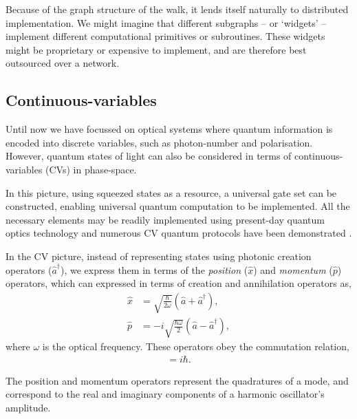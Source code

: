Because of the graph structure of the walk, it lends itself naturally to distributed implementation. We might imagine that different subgraphs -- or `widgets' \cite{bib:Lovett10, bib:Childs09} -- implement different computational primitives or subroutines. These widgets might be proprietary or expensive to implement, and are therefore best outsourced over a network.

%
%

\subsection{Continuous-variables} \label{sec:CV_QC} 

Until now we have focussed on optical systems where quantum information is encoded into discrete variables, such as photon-number and polarisation. However, quantum states of light can also be considered in terms of continuous-variables (CVs) in phase-space.

In this picture, using squeezed states as a resource, a universal gate set can be constructed, enabling universal quantum computation to be implemented. All the necessary elements may be readily implemented using present-day quantum optics technology and numerous CV quantum protocols have been demonstrated \cite{bib:RevModPhys.77.513}.

In the CV picture, instead of representing states using photonic creation operators ($\hat a^\dag$), we express them in terms of the \textit{position} ($\hat x$) and \textit{momentum} ($\hat p$) operators, which can expressed in terms of creation and annihilation operators as,
\begin{align}
\hat x &=    \sqrt{\frac{\hbar}{2 \omega}}(\hat a + \hat a^\dag), \nonumber \\
\hat p &= -i \sqrt{\frac{\hbar  \omega}{2}}(\hat a - \hat a^\dag), 
\end{align}
where $\omega$ is the optical frequency. These operators obey the commutation relation,
\begin{align}
[\hat x, \hat p] = i \hbar.
\end{align}

The position and momentum operators represent the quadratures of a mode, and correspond to the real and imaginary components of a harmonic oscillator's amplitude.

